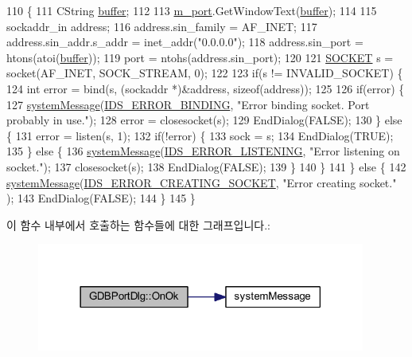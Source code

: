 \begin{DoxyCode}
110 \{
111   CString \mbox{\hyperlink{_g_b_a_8cpp_a28d4d3d8445e73a696b2d6f7eadabd96}{buffer}};
112 
113   \mbox{\hyperlink{class_g_d_b_port_dlg_a243e7307371feed3fe058cbf822c3cb0}{m\_port}}.GetWindowText(\mbox{\hyperlink{_g_b_a_8cpp_a28d4d3d8445e73a696b2d6f7eadabd96}{buffer}});
114   
115   sockaddr\_in address;
116   address.sin\_family = AF\_INET;
117   address.sin\_addr.s\_addr = inet\_addr(\textcolor{stringliteral}{"0.0.0.0"});
118   address.sin\_port = htons(atoi(\mbox{\hyperlink{_g_b_a_8cpp_a28d4d3d8445e73a696b2d6f7eadabd96}{buffer}}));
119   port = ntohs(address.sin\_port);
120 
121   \mbox{\hyperlink{remote_8cpp_aff55fe551a9992a54ec54621c524d0a4}{SOCKET}} s = socket(AF\_INET, SOCK\_STREAM, 0);
122 
123   \textcolor{keywordflow}{if}(s != INVALID\_SOCKET) \{
124     \textcolor{keywordtype}{int} error = bind(s, (sockaddr *)&address, \textcolor{keyword}{sizeof}(address));
125 
126     \textcolor{keywordflow}{if}(error) \{
127       \mbox{\hyperlink{system_8cpp_a747a9cb8e015a3d45cca636b5bd0fc69}{systemMessage}}(\mbox{\hyperlink{resource_8h_ad710ade624efbb97bed024bf6b875329}{IDS\_ERROR\_BINDING}}, \textcolor{stringliteral}{"Error binding socket. Port probably
       in use."});
128       error = closesocket(s);
129       EndDialog(FALSE);
130     \} \textcolor{keywordflow}{else} \{
131       error = listen(s, 1);
132       \textcolor{keywordflow}{if}(!error) \{
133         sock = s;
134         EndDialog(TRUE);
135       \} \textcolor{keywordflow}{else} \{
136         \mbox{\hyperlink{system_8cpp_a747a9cb8e015a3d45cca636b5bd0fc69}{systemMessage}}(\mbox{\hyperlink{resource_8h_ace2af83a097a2520aa7926b8a58692d8}{IDS\_ERROR\_LISTENING}}, \textcolor{stringliteral}{"Error listening on socket."});
137         closesocket(s);
138         EndDialog(FALSE);
139       \}
140     \}
141   \} \textcolor{keywordflow}{else} \{
142     \mbox{\hyperlink{system_8cpp_a747a9cb8e015a3d45cca636b5bd0fc69}{systemMessage}}(\mbox{\hyperlink{resource_8h_acdf73ecabb0bc22c704c5e4f5adbdee0}{IDS\_ERROR\_CREATING\_SOCKET}}, \textcolor{stringliteral}{"Error creating socket."}
      );
143     EndDialog(FALSE);
144   \}
145 \}
\end{DoxyCode}
이 함수 내부에서 호출하는 함수들에 대한 그래프입니다.\+:
\nopagebreak
\begin{figure}[H]
\begin{center}
\leavevmode
\includegraphics[width=306pt]{class_g_d_b_port_dlg_a1f6d1611b04e5e1803b4d2faf1a117f2_cgraph}
\end{center}
\end{figure}


